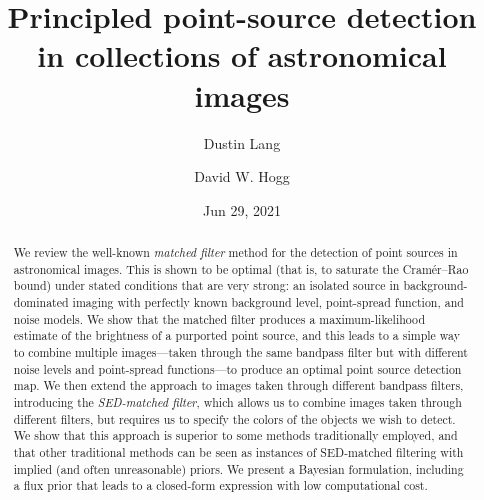 \documentclass[11pt,letterpaper,linenumbers]{aastex63}
\begin{document}
\title{Principled point-source detection in collections of astronomical images}
\author{Dustin Lang}
\author{David W. Hogg}
\date{Jun 29, 2021}

\begin{abstract}
We review the well-known \emph{matched filter} method for the
detection of point sources in astronomical images.  This is shown to
be optimal (that is, to saturate the Cram\'er--Rao bound) under stated
conditions that are very strong: an isolated source in
background-dominated imaging with perfectly known background level,
point-spread function, and noise models.  We show that the matched
filter produces a maximum-likelihood estimate of the brightness of a
purported point source, and this leads to a simple way to combine
multiple images---taken through the same bandpass filter but with
different noise levels and point-spread functions---to produce an
optimal point source detection map.  We then extend the approach to
images taken through different bandpass filters, introducing the
\emph{SED-matched filter}, which allows us to combine images taken
through different filters, but requires us to specify the colors of
the objects we wish to detect.  We show that this approach is superior
to some methods traditionally employed, and that other traditional
methods can be seen as instances of SED-matched filtering with implied
(and often unreasonable) priors.
We present a Bayesian formulation, including a flux prior that leads to
a closed-form expression with low computational cost.
\end{abstract}
\end{document}

